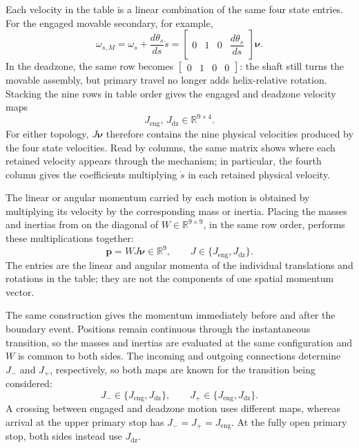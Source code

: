\documentclass[11pt]{report}
\numberwithin{equation}{section}
\begin{document}
Each velocity in the table is a linear combination of the same four state
entries. For the engaged movable secondary, for example,
\begin{equation}
    \omega_{s,M}
    =
    \omega_s
    +
    \frac{d\theta_s}{ds}\dot s
    =
    \begin{bmatrix}
        0 & 1 & 0 & \dfrac{d\theta_s}{ds}
    \end{bmatrix}
    \boldsymbol{\nu}.
    \label{eq:finite_event_secondary_velocity_row_example}
\end{equation}
In the deadzone, the same row becomes \(
    \begin{bmatrix}
        0 & 1 & 0 & 0
    \end{bmatrix}
\): the shaft still turns the movable assembly, but primary travel no longer
adds helix-relative rotation. Stacking the nine rows in table order gives the
engaged and deadzone velocity maps
\begin{equation}
    J_{\mathrm{eng}},\,J_{\mathrm{dz}}
    \in \mathbb{R}^{9\times4}.
    \label{eq:finite_event_velocity_map_dimensions}
\end{equation}
For either topology, \(J\boldsymbol{\nu}\) therefore contains the nine
physical velocities produced by the four state velocities. Read by columns,
the same matrix shows where each retained velocity appears through the
mechanism; in particular, the fourth column gives the coefficients multiplying
\(\dot s\) in each retained physical velocity.

The linear or angular momentum carried by each motion is obtained by
multiplying its velocity by the corresponding mass or inertia. Placing the
masses and inertias from  on the
diagonal of \(W\in\mathbb{R}^{9\times9}\), in the same row order, performs
these multiplications together:
\begin{equation}
    \boldsymbol p
    =
    WJ\boldsymbol\nu
    \in\mathbb{R}^{9},
    \qquad
    J\in\{J_{\mathrm{eng}},J_{\mathrm{dz}}\}.
    \label{eq:finite_event_physical_momentum_inventory}
\end{equation}
The entries are the linear and angular momenta of the individual translations
and rotations in the table; they are not the components of one spatial
momentum vector.

The same construction gives the momentum immediately before and after the
boundary event. Positions remain continuous through the instantaneous
transition, so the masses and inertias are evaluated at the same configuration
and \(W\) is common to both sides. The incoming and outgoing connections
determine \(J_-\) and \(J_+\), respectively, so both maps are known for the
transition being considered:
\begin{equation}
    J_-
    \in\{J_{\mathrm{eng}},J_{\mathrm{dz}}\},
    \qquad
    J_+
    \in\{J_{\mathrm{eng}},J_{\mathrm{dz}}\}.
    \label{eq:finite_event_side_maps}
\end{equation}
A crossing between engaged and deadzone motion uses different maps, whereas
arrival at the upper primary stop has \(J_-=J_+=J_{\mathrm{eng}}\). At the
fully open primary stop, both sides instead use \(J_{\mathrm{dz}}\).
\end{document}
